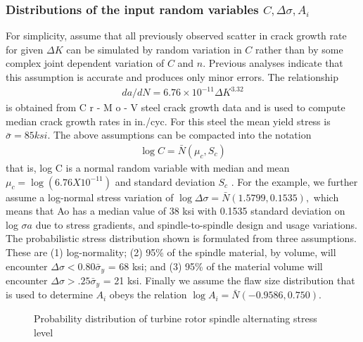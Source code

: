 \documentclass[12pt]{article}
\begin{document}
\subsubsection{Distributions of the input random variables {$C, \Delta \sigma, A_i$}}
For simplicity, assume that all previously observed
scatter in crack growth rate for given $\Delta K$ can be simulated 
by random variation in $C$ rather than by some
complex joint dependent variation of $C$ and $n$. 
Previous analyses indicate that this assumption is accurate
and produces only minor errors. The relationship
\begin{align*}
    da/dN = 6.76 \times 10^{-11} \Delta K^{3.32}
\end{align*}
is obtained from
C r - M o - V steel crack growth data and is used
to compute median crack growth rates in in./cyc.
For this steel the mean yield stress is $\bar{\sigma} = 85 ksi$.
The above assumptions can be compacted into the
notation
\begin{align*}
    \log C = \bar{N}(\mu_c, S_c)
\end{align*}
that is, log C is a normal random variable with median
and mean $\mu_c = \log (6.76 X 10^{-11})$ and standard deviation 
$S_c$ .
For the example, we further assume a log-normal
stress variation of
$\log \Delta \sigma =\bar{N}(1.5799, 0.1535),$
which means that Ao has a median value of 38 ksi
with 0.1535 standard deviation on log $\sigma a$ due to
stress gradients, and spindle-to-spindle design and
usage variations. The probabilistic stress distribution
shown is formulated from three assumptions. 
These are (1) log-normality; (2) 95\% of the
spindle material, by volume, will encounter 
$\Delta \sigma <0.80 \bar{\sigma}_y$ = 68 ksi; and (3) 95\% of the material volume
will encounter $\Delta \sigma > .25 \bar{\sigma}_y$ = 21 ksi.
Finally we assume the flaw size distribution that
is used to determine $A_i$ obeys the relation $\log A_i = \bar{N}( -0.9586, 0.750).$
\begin{figure}[H]
    \centering
    \captionsetup{labelformat=empty}
    \caption{Probability distribution of turbine rotor spindle alternating stress level}  
\end{figure}
\end{document}

